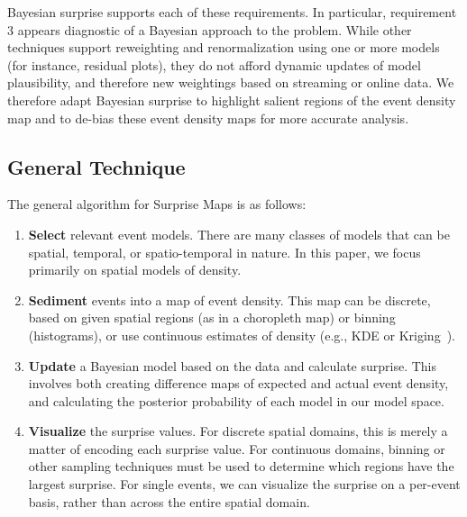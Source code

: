 \documentclass[journal]{vgtc}                %
\begin{document}
Bayesian surprise supports each of these requirements. In particular, requirement 3 appears diagnostic of a Bayesian approach to the problem. While other techniques support reweighting and renormalization using one or more models (for instance, residual plots), they do not afford dynamic updates of model plausibility, and therefore new weightings based on streaming or online data. We therefore adapt Bayesian surprise to highlight salient regions of the event density map and to de-bias these event density maps for more accurate analysis.

\subsection{General Technique}

The general algorithm for Surprise Maps is as follows:

\begin{enumerate}
	\item \textbf{Select} relevant event models. There are many classes of models that can be spatial, temporal, or spatio-temporal in nature. In this paper, we focus primarily on spatial models of density.
	\item \textbf{Sediment} events into a map of event density. This map can be discrete, based on given spatial regions (as in a choropleth map) or binning (histograms), or use continuous estimates of density (e.g., KDE or Kriging~\cite{oliver1990kriging}).
	\item \textbf{Update} a Bayesian model based on the data and calculate surprise. This involves both creating difference maps of expected and actual event density, and calculating the posterior probability of each model in our model space.
	\item \textbf{Visualize} the surprise values. For discrete spatial domains, this is merely a matter of encoding each surprise value. For continuous domains, binning or other sampling techniques must be used to determine which regions have the largest surprise. For single events, we can visualize the surprise on a per-event basis, rather than across the entire spatial domain.
\end{enumerate}
\end{document}
